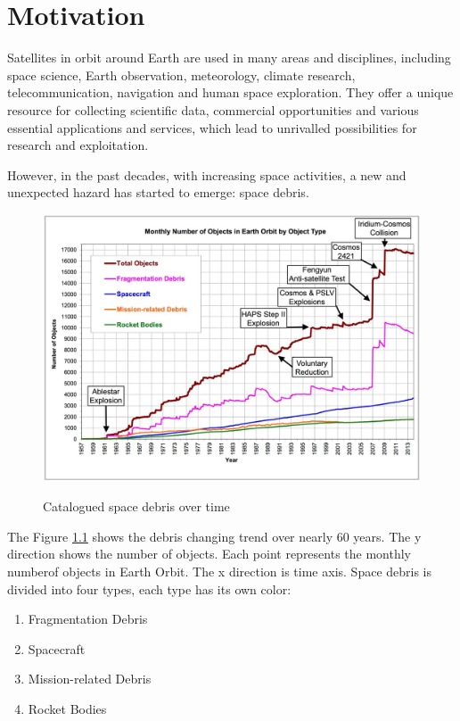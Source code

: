 \chapter{Motivation}\label{sec-motivation}

Satellites in orbit around Earth are used in many areas and disciplines, including space science, Earth observation, meteorology, climate research, telecommunication, navigation and human space exploration. They offer a unique resource for collecting scientific data, commercial opportunities and various essential applications and services, which lead to unrivalled possibilities for research and exploitation.

However, in the past decades, with increasing space activities, a new and unexpected hazard has started to emerge: space debris.

\begin{figure}[ht]
\centering
\includegraphics[width=1\textwidth]{fig/motivation/CataloguedSpaceDebrisOverTime}
\caption{Catalogued space debris over time}\cite{wright2010current}
\label{moti-CataloguedSpaceDebrisOverTime}
\end{figure}

The Figure \ref{moti-CataloguedSpaceDebrisOverTime} shows the debris changing trend over nearly 60 years. The y direction shows the number of objects. Each point represents the monthly numberof objects in Earth Orbit. The x direction is time axis. Space debris is divided into four types, each type has its own color: 
\begin{enumerate}
\item{Fragmentation Debris}
\item{Spacecraft}
\item{Mission-related Debris}
\item{Rocket Bodies}
\end{enumerate}


